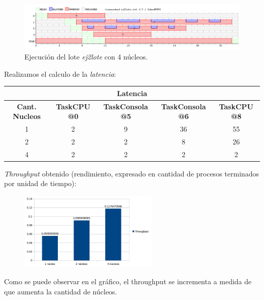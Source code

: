 \begin{figure}[!h]
	\begin{center}
		\includegraphics[width=500px]{imagenes/ej2_4.png}
		\caption{Ejecución del lote \emph{ej2lote} con 4 núcleos.}
		\label{fig:grafico_ej2_4}
	\end{center}
\end{figure}

\newpage
Realizamos el calculo de la \textit{latencia}:

\begin{center}
	\begin{tabular}{|c|c|c|c|c|}
		\hline
		\multicolumn{5}{|c|}{\textbf{Latencia}} \\
		\hline
		\textbf{Cant. Nucleos} & \textbf{TaskCPU @0} & \textbf{TaskConsola @5} & \textbf{TaskConsola @6} & \textbf{TaskCPU @8} \\
		\hline
		1 & 2 & 9 & 36 & 55 \\
		2 & 2 & 2 & 8 & 26 \\
		4 & 2 & 2 & 2 & 2 \\
		\hline
	\end{tabular}
\end{center}

\textit{Throughput} obtenido (rendimiento, expresado en cantidad de procesos terminados por unidad de tiempo):
\begin{figure}[!h]
	\begin{center}
		\includegraphics[width=250px]{imagenes/ej2_throughput.png}

		\label{fig:grafico_ej2_throughput}
	\end{center}
\end{figure}

Como se puede observar en el gráfico, el throughput se incrementa a medida de que aumenta la cantidad de núcleos.

